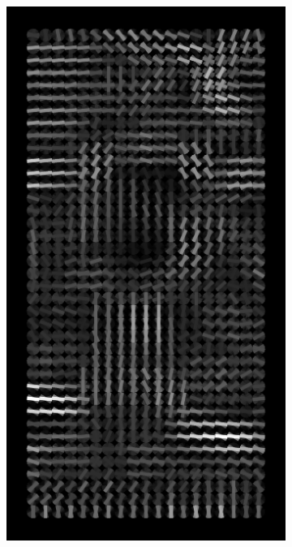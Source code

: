\documentclass[thesis.tex]{subfiles}
\begin{document}
\begin{figure}[tb]
{	\begin{subfigure}[t]{0.17\textwidth}
		\includegraphics[width=\textwidth]{img/inriaExampleDescriptor.pdf}
		\caption{}
		\label{fig:inriaExampleDescriptor}
		\vspace{2mm}
	\end{subfigure}
	\begin{subfigure}[t]{0.17\textwidth}

\end{subfigure}}
\end{figure}
\end{document}

